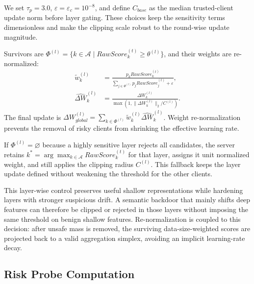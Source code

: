 \documentclass[conference,compsoc]{IEEEtran}
\begin{document}
We set $\tau_p=3.0$, $\varepsilon=\varepsilon_c=10^{-8}$, and define $C_{base}$ as the median trusted-client update norm before layer gating. These choices keep the sensitivity terms dimensionless and make the clipping scale robust to the round-wise update magnitude.

Survivors are $\Phi^{(l)}=\{k\in\mathcal{A}\mid RawScore_k^{(t)}\ge\theta^{(l)}\}$, and their weights are re-normalized:
\begin{equation}
\begin{aligned}
    \tilde{w}_{k}^{(l)}&=\frac{p_kRawScore_k^{(t)}}{\sum_{j\in\Phi^{(l)}}p_jRawScore_j^{(t)}+\varepsilon},\\
    \widehat{\Delta W}_k^{(l)}&=\frac{\Delta W_k^{(l)}}{\max(1,\|\Delta W_k^{(l)}\|_2/C^{(l)})}.
\end{aligned}
\end{equation}
The final update is $\Delta W_{global}^{(l)}=\sum_{k\in\Phi^{(l)}}\tilde{w}_{k}^{(l)}\widehat{\Delta W}_k^{(l)}$. Weight re-normalization prevents the removal of risky clients from shrinking the effective learning rate.

If $\Phi^{(l)}=\varnothing$ because a highly sensitive layer rejects all candidates, the server retains $k^*=\arg\max_{k\in\mathcal{A}}RawScore_k^{(t)}$ for that layer, assigns it unit normalized weight, and still applies the clipping radius $C^{(l)}$. This fallback keeps the layer update defined without weakening the threshold for the other clients.

This layer-wise control preserves useful shallow representations while hardening layers with stronger suspicious drift. A semantic backdoor that mainly shifts deep features can therefore be clipped or rejected in those layers without imposing the same threshold on benign shallow features. Re-normalization is coupled to this decision: after unsafe mass is removed, the surviving data-size-weighted scores are projected back to a valid aggregation simplex, avoiding an implicit learning-rate decay.

\subsection{Risk Probe Computation}
\end{document}
